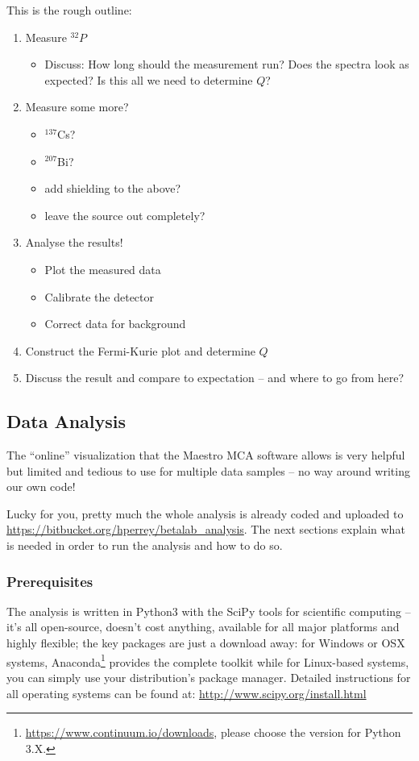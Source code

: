 \documentclass[a4,11pt, notitlepage]{article}
\begin{document}
This is the rough outline:
\begin{enumerate}
\item Measure $^{32}P$
  \begin{itemize}
  \item Discuss: How long should the measurement run? Does the spectra
    look as expected? Is this all we need to determine $Q$?
  \end{itemize}
\item Measure some more?
  \begin{itemize}
  \item $^{137}$Cs?
  \item $^{207}$Bi?
  \item add shielding to the above?
  \item leave the source out completely?
  \end{itemize}
\item Analyse the results!
  \begin{itemize}
  \item Plot the measured data
  \item Calibrate the detector
  \item Correct data for background
  \end{itemize}
\item Construct the Fermi-Kurie plot and determine $Q$
\item Discuss the result and compare to expectation -- and where to go
  from here?
\end{enumerate}

\subsection{Data Analysis}
\label{sec:data-analysis}

The ``online'' visualization that the Maestro MCA software allows is
very helpful but limited and tedious to use for multiple data samples
-- no way around writing our own code!

Lucky for you, pretty much the whole analysis is already coded and
uploaded to
\url{https://bitbucket.org/hperrey/betalab_analysis}. The next
sections explain what is needed in order to run the analysis and how
to do so.

\subsubsection{Prerequisites}
\label{sec:prerequisites}

The analysis is written in Python3 with the SciPy tools for scientific
computing -- it's all open-source, doesn't cost anything, available
for all major platforms and highly flexible; the key packages are just
a download away: for Windows or OSX systems,
Anaconda\footnote{\url{https://www.continuum.io/downloads}, please
  choose the version for Python 3.X.} provides
the complete toolkit while for Linux-based systems, you can simply use
your distribution's package manager. Detailed instructions for all
operating systems can be found at: \url{http://www.scipy.org/install.html}
\end{document}
